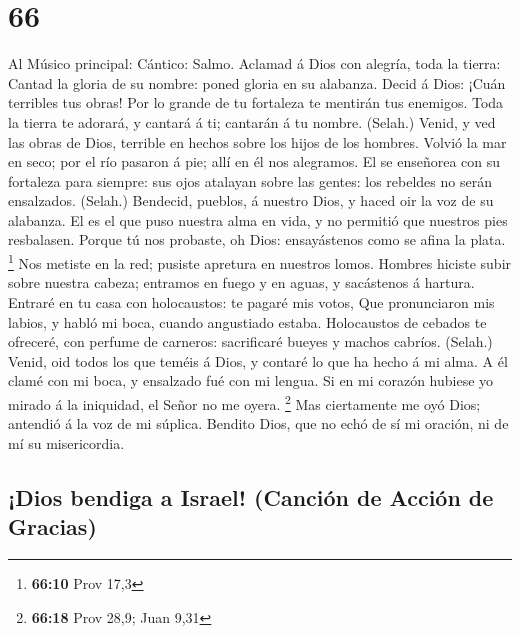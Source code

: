 \hypertarget{section-65}{%
\section{66}\label{section-65}}

 Al Músico principal: Cántico: Salmo. Aclamad á Dios con
alegría, toda la tierra:  Cantad la gloria de su nombre:
poned gloria en su alabanza.  Decid á Dios: ¡Cuán terribles
tus obras! Por lo grande de tu fortaleza te mentirán tus enemigos.
 Toda la tierra te adorará, y cantará á ti; cantarán á tu
nombre. (Selah.)  Venid, y ved las obras de Dios, terrible
en hechos sobre los hijos de los hombres.  Volvió la mar en
seco; por el río pasaron á pie; allí en él nos alegramos. 
El se enseñorea con su fortaleza para siempre: sus ojos atalayan sobre
las gentes: los rebeldes no serán ensalzados. (Selah.) 
Bendecid, pueblos, á nuestro Dios, y haced oir la voz de su alabanza.
 El es el que puso nuestra alma en vida, y no permitió que
nuestros pies resbalasen.  Porque tú nos probaste, oh Dios:
ensayástenos como se afina la plata. \footnote{\textbf{66:10} Prov 17,3}
 Nos metiste en la red; pusiste apretura en nuestros lomos.
 Hombres hiciste subir sobre nuestra cabeza; entramos en
fuego y en aguas, y sacástenos á hartura.  Entraré en tu
casa con holocaustos: te pagaré mis votos,  Que
pronunciaron mis labios, y habló mi boca, cuando angustiado estaba.
 Holocaustos de cebados te ofreceré, con perfume de
carneros: sacrificaré bueyes y machos cabríos. (Selah.) 
Venid, oid todos los que teméis á Dios, y contaré lo que ha hecho á mi
alma.  A él clamé con mi boca, y ensalzado fué con mi
lengua.  Si en mi corazón hubiese yo mirado á la iniquidad,
el Señor no me oyera. \footnote{\textbf{66:18} Prov 28,9; Juan 9,31}
 Mas ciertamente me oyó Dios; antendió á la voz de mi
súplica.  Bendito Dios, que no echó de sí mi oración, ni de
mí su misericordia.

\hypertarget{dios-bendiga-a-israel-canciuxf3n-de-acciuxf3n-de-gracias}{%
\subsection{¡Dios bendiga a Israel! (Canción de Acción de
Gracias)}\label{dios-bendiga-a-israel-canciuxf3n-de-acciuxf3n-de-gracias}}

